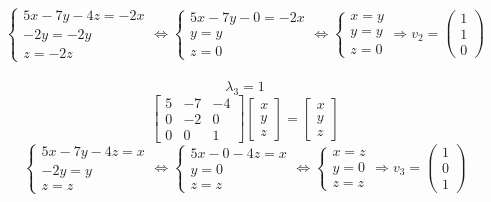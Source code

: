 \documentclass[a3paper,14pt]{extarticle}
\begin{document}
$$\begin{cases}
    5x-7y-4z=-2x \\
    -2y = -2y \\
    z = -2z
\end{cases} \Leftrightarrow \begin{cases}
    5x-7y-0=-2x \\
    y = y \\
    z = 0
\end{cases} \Leftrightarrow \begin{cases}
    x = y \\
    y = y \\
    z = 0
\end{cases} \Rightarrow v_2 = \begin{pmatrix}
    1 \\ 1 \\ 0
\end{pmatrix}$$\,\\
$$\lambda_3 = 1$$
$$\begin{bmatrix}
    5 & -7 & -4 \\ 0 & -2 & 0 \\ 0 & 0 & 1
\end{bmatrix}\begin{bmatrix}
    x \\ y \\ z
\end{bmatrix} = \begin{bmatrix}
    x \\ y \\ z
\end{bmatrix}$$
$$\begin{cases}
    5x-7y-4z=x \\
    -2y = y \\
    z = z
\end{cases} \Leftrightarrow \begin{cases}
    5x-0-4z=x \\
    y = 0 \\
    z = z
\end{cases} \Leftrightarrow \begin{cases}
    x = z \\
    y = 0 \\
    z = z
\end{cases} \Rightarrow v_3 = \begin{pmatrix}
    1 \\ 0 \\ 1
\end{pmatrix}$$ \, \\[10mm]
\end{document}
